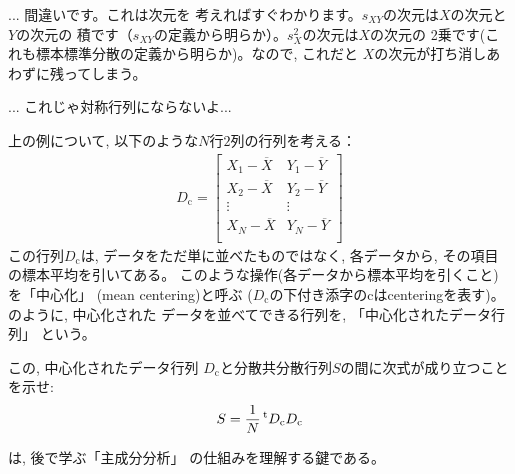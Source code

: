 \begin{freqmiss}{\small{} ... 間違いです。これは次元を
考えればすぐわかります。$s_{XY}$の次元は$X$の次元と$Y$の次元の
積です（$s_{XY}$の定義から明らか）。$s_X^2$の次元は$X$の次元の
2乗です(これも標本標準分散の定義から明らか)。なので, これだと
$X$の次元が打ち消しあわずに残ってしまう。}\end{freqmiss}\mv

\begin{freqmiss}{\small{} ... これじゃ対称行列にならないよ...}\end{freqmiss}\mv


上の例について, 以下のような$N$行$2$列の行列を考える：\\
\begin{eqnarray}
D_{\text{c}}=\begin{bmatrix}
X_1 - \overline{X} & Y_1 - \overline{Y}\\
X_2 - \overline{X} & Y_2 - \overline{Y}\\
\vdots & \vdots\\
X_N - \overline{X} & Y_N - \overline{Y}\\
\end{bmatrix}\label{eq:PCA_data_matrix2D}
\end{eqnarray}
この行列$D_{\text{c}}$は, データをただ単に並べたものではなく, 
各データから, その項目の標本平均を引いてある。
このような操作(各データから標本平均を引くこと)を「中心化」
 (mean centering)と呼ぶ
($D_{\text{c}}$の下付き添字のcはcenteringを表す)。
のように, 中心化された
データを並べてできる行列を, 「中心化されたデータ行列」
という。

\begin{q}\label{q:covar_matrix} この, 中心化されたデータ行列
$D_{\text{c}}$と分散共分散行列$S$の間に次式が成り立つことを示せ:
\begin{eqnarray}
S=\frac{1}{N}\,^{\text t}D_{\text{c}}D_{\text{c}}\label{eq:covmatrix_S_StD}
\end{eqnarray}
\end{q}
\mv
{}は, 後で学ぶ「主成分分析」
の仕組みを理解する鍵である。\\

